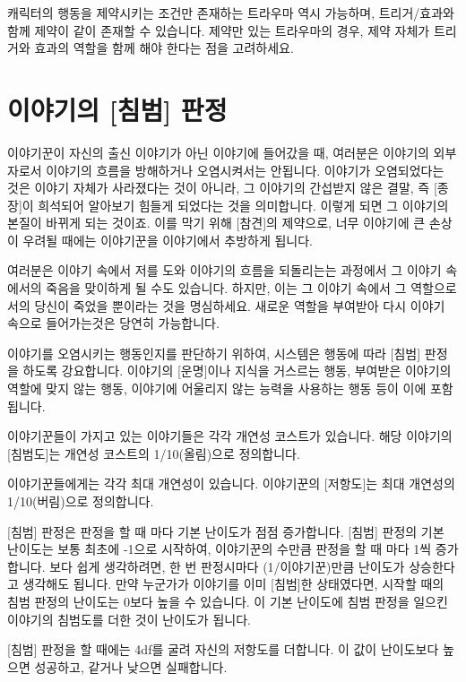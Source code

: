 \documentclass[12pt]{report}
\newcommand{\world}[1]{{\nanumpen \large #1 \par}\bigskip}
\begin{document}
	캐릭터의 행동을 제약시키는 조건만 존재하는 트라우마 역시 가능하며, 트리거/효과와 함께 제약이 같이 존재할 수 있습니다. 제약만 있는 트라우마의 경우, 제약 자체가 트리거와 효과의 역할을 함께 해야 한다는 점을 고려하세요.
	
	
	\chapter{이야기의 [침범] 판정}\label{침범_판정}
	\world{이야기꾼이 자신의 출신 이야기가 아닌 이야기에 들어갔을 때, 여러분은 이야기의 외부자로서 이야기의 흐름을 방해하거나 오염시켜서는 안됩니다. 이야기가 오염되었다는 것은 이야기 자체가 사라졌다는 것이 아니라, 그 이야기의 간섭받지 않은 결말, 즉 [종장]이 희석되어 알아보기 힘들게 되었다는 것을 의미합니다. 이렇게 되면 그 이야기의 본질이 바뀌게 되는 것이죠. 이를 막기 위해 [참견]의 제약으로, 너무 이야기에 큰 손상이 우려될 때에는 이야기꾼을 이야기에서 추방하게 됩니다.}
	\world{여러분은 이야기 속에서 저를 도와 이야기의 흐름을 되돌리는는 과정에서 그 이야기 속에서의 죽음을 맞이하게 될 수도 있습니다. 하지만, 이는 그 이야기 속에서 그 역할으로서의 당신이 죽었을 뿐이라는 것을 명심하세요. 새로운 역할을 부여받아 다시 이야기 속으로 들어가는것은 당연히 가능합니다.}
	
	이야기를 오염시키는 행동인지를 판단하기 위하여, 시스템은 행동에 따라 [침범] 판정을 하도록 강요합니다. 이야기의 [운명]이나 지식을 거스르는 행동, 부여받은 이야기의 역할에 맞지 않는 행동, 이야기에 어울리지 않는 능력을 사용하는 행동 등이 이에 포함됩니다.
	
	이야기꾼들이 가지고 있는 이야기들은 각각 개연성 코스트가 있습니다. 해당 이야기의 [침범도]는 개연성 코스트의 1/10(올림)으로 정의합니다.
	
	이야기꾼들에게는 각각 최대 개연성이 있습니다. 이야기꾼의 [저항도]는 최대 개연성의 1/10(버림)으로 정의합니다.
	
	\bigskip
	
	[침범] 판정은 판정을 할 때 마다 기본 난이도가 점점 증가합니다. [침범] 판정의 기본 난이도는 보통 최초에 -1으로 시작하여, 이야기꾼의 수만큼 판정을 할 때 마다 1씩 증가합니다. 보다 쉽게 생각하려면, 한 번 판정시마다 (1/이야기꾼)만큼 난이도가 상승한다고 생각해도 됩니다. 만약 누군가가 이야기를 이미 [침범]한 상태였다면, 시작할 때의 침범 판정의 난이도는 0보다 높을 수 있습니다. 이 기본 난이도에 침범 판정을 일으킨 이야기의 침범도를 더한 것이 난이도가 됩니다.
	
	[침범] 판정을 할 때에는 4df를 굴려 자신의 저항도를 더합니다. 이 값이 난이도보다 높으면 성공하고, 같거나 낮으면 실패합니다.
	
\end{document}
